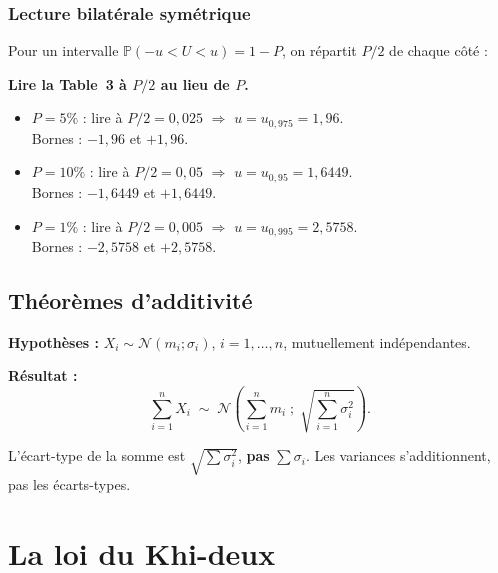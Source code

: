 \documentclass[11pt,a4paper]{article}
\newcommand{\N}{\mathcal{N}}
\newcommand{\Prob}{\mathbb{P}}
\renewcommand{\P}{\Prob}
\begin{document}
\subsubsection{Lecture bilat\'erale sym\'etrique}

Pour un intervalle $\P(-u < U < u) = 1 - P$, on r\'epartit $P/2$ de chaque c\^ot\'e :

\begin{methbox}
\textbf{Lire la Table~3 \`a $P/2$ au lieu de $P$.}
\begin{itemize}
\item $P = 5\%$ : lire \`a $P/2 = 0{,}025$ $\Rightarrow$ $u = u_{0{,}975} = 1{,}96$.\\ Bornes : $-1{,}96$ et $+1{,}96$.
\item $P = 10\%$ : lire \`a $P/2 = 0{,}05$ $\Rightarrow$ $u = u_{0{,}95} = 1{,}6449$.\\ Bornes : $-1{,}6449$ et $+1{,}6449$.
\item $P = 1\%$ : lire \`a $P/2 = 0{,}005$ $\Rightarrow$ $u = u_{0{,}995} = 2{,}5758$.\\ Bornes : $-2{,}5758$ et $+2{,}5758$.
\end{itemize}
\end{methbox}

\subsection{Th\'eor\`emes d'additivit\'e}

\begin{thmbox}
\textbf{Hypoth\`eses :} $X_i \sim \N(m_i;\sigma_i)$, $i=1,\ldots,n$, mutuellement ind\'ependantes.

\textbf{R\'esultat :}
$$\sum_{i=1}^{n} X_i \;\sim\; \N\!\left(\sum_{i=1}^{n} m_i\;;\;\sqrt{\sum_{i=1}^{n} \sigma_i^2}\right).$$
\end{thmbox}

\begin{alertbox}[Rappel]
L'\'ecart-type de la somme est $\sqrt{\sum \sigma_i^2}$, \textbf{pas} $\sum \sigma_i$. Les variances s'additionnent, pas les \'ecarts-types.
\end{alertbox}

\newpage
\section{La loi du Khi-deux}
\end{document}

